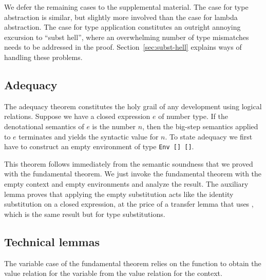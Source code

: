 \documentclass[acmsmall,anonymous,review,screen]{acmart}
\begin{document}
We defer the remaining cases to the supplemental material.
The case for type abstraction is similar, but slightly more involved than the case
for lambda abstraction.
The case for type application constitutes an outright annoying
excursion to ``subst hell'', where an overwhelming number of type
mismatches needs to be addressed in the proof. Section~\ref{sec:subst-hell} explains
ways of handling these problems.

\subsection{Adequacy}
\label{sec:adequacy}

The adequacy theorem constitutes the holy grail of any development
using logical relations.
Suppose we have a closed expression $e$ of number type.
If the denotational semantics of $e$ is the number $n$, then the big-step
semantics applied to $e$ terminates and yields the syntactic value for
$n$.
To state adequacy we first have to construct an empty
environment of type \texttt{Env [] {\Anull} []}.

\begin{minipage}{0.3\linewidth}
  \FundamentalEmptyEnv
\end{minipage}
\begin{minipage}{0.3\linewidth}
  \FundamentalEmptyRelEnv
\end{minipage}
\begin{minipage}{0.3\linewidth}
  \FundamentalEmptyCSub
\end{minipage}
\FundamentalAdequacyType
This theorem follows immediately from the semantic soundness that we proved with the
fundamental theorem.
\FundamentalAdequacyBody
We just invoke the fundamental theorem with the empty context and empty
environments and analyze the result. The auxiliary lemma
{\ACsubClosed} proves that applying the empty substitution acts like
the identity substitution on a closed expression, at the price of a
transfer lemma that uses {\ATsubClosed}, which is the same result
but for type substitutions.
\FundamentalCsubClosed


\subsection{Technical lemmas}
\label{sec:technical-lemmas}

The variable case of the fundamental theorem relies on the function
{\AGLookup} to obtain the value relation for the variable from the
value relation for the context. 
\LRVrenMCGLookupType
\end{document}
